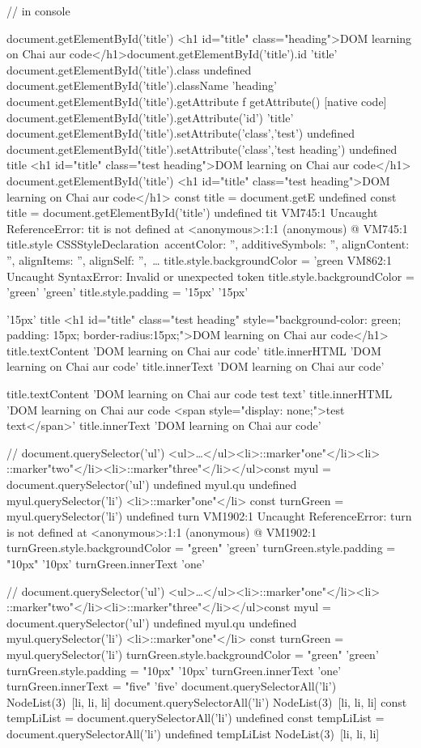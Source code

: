 // in console

document.getElementById('title')
<h1 id=​"title" class=​"heading">​DOM learning on Chai aur code​</h1>​
document.getElementById('title').id
'title'
document.getElementById('title').class
undefined
document.getElementById('title').className
'heading'
document.getElementById('title').getAttribute
ƒ getAttribute() { [native code] }
document.getElementById('title').getAttribute('id')
'title'
document.getElementById('title').setAttribute('class','test')
undefined
document.getElementById('title').setAttribute('class','test heading')
undefined
title
<h1 id=​"title" class=​"test heading">​DOM learning on Chai aur code​</h1>​
document.getElementById('title')
<h1 id=​"title" class=​"test heading">​DOM learning on Chai aur code​</h1>​
const title = document.getE
undefined
const title = document.getElementById('title')
undefined
tit
VM745:1 Uncaught ReferenceError: tit is not defined
    at <anonymous>:1:1
(anonymous) @ VM745:1
title.style
CSSStyleDeclaration {accentColor: '', additiveSymbols: '', alignContent: '', alignItems: '', alignSelf: '', …}
title.style.backgroundColor = 'green
VM862:1 Uncaught SyntaxError: Invalid or unexpected token
title.style.backgroundColor = 'green'
'green'
title.style.padding = '15px'
'15px'

'15px'
title
<h1 id=​"title" class=​"test heading" style=​"background-color:​ green;​ padding:​ 15px;​ border-radius:​ 15px;​">​DOM learning on Chai aur code​</h1>​
title.textContent
'DOM learning on Chai aur code'
title.innerHTML
'DOM learning on Chai aur code'
title.innerText
'DOM learning on Chai aur code'

title.textContent
'DOM learning on Chai aur code test text'
title.innerHTML
'DOM learning on Chai aur code <span style="display: none;">test text</span>'
title.innerText
'DOM learning on Chai aur code'



// 
document.querySelector('ul')
<ul>​…​</ul>​<li>​::marker​"one"</li>​<li>​::marker​"two"</li>​<li>​::marker​"three"</li>​</ul>​
const myul = document.querySelector('ul')
undefined
myul.qu
undefined
myul.querySelector('li')
<li>​::marker​"one"</li>​
const turnGreen = myul.querySelector('li')
undefined
turn
VM1902:1 Uncaught ReferenceError: turn is not defined
    at <anonymous>:1:1
(anonymous) @ VM1902:1
turnGreen.style.backgroundColor = "green"
'green'
turnGreen.style.padding = "10px"
'10px'
turnGreen.innerText
'one'

//
document.querySelector('ul')
<ul>​…​</ul>​<li>​::marker​"one"</li>​<li>​::marker​"two"</li>​<li>​::marker​"three"</li>​</ul>​
const myul = document.querySelector('ul')
undefined
myul.qu
undefined
myul.querySelector('li')
<li>​::marker​"one"</li>​
const turnGreen = myul.querySelector('li')
turnGreen.style.backgroundColor = "green"
'green'
turnGreen.style.padding = "10px"
'10px'
turnGreen.innerText
'one'
turnGreen.innerText = "five"
'five'
document.querySelectorAll('li')
NodeList(3) [li, li, li]
document.querySelectorAll('li')
NodeList(3) [li, li, li]
const tempLiList = document.querySelectorAll('li')
undefined
const tempLiList = document.querySelectorAll('li')
undefined
tempLiList
NodeList(3) [li, li, li]


